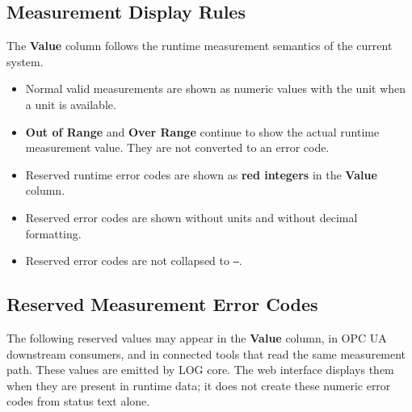 \documentclass[11pt,a4paper]{article}
\begin{document}
\subsection{Measurement Display Rules}
The \textbf{Value} column follows the runtime measurement semantics of the current system.

\begin{itemize}
\item Normal valid measurements are shown as numeric values with the unit when a unit is available.
\item \textbf{Out of Range} and \textbf{Over Range} continue to show the actual runtime measurement value. They are not converted to an error code.
\item Reserved runtime error codes are shown as \textbf{red integers} in the \textbf{Value} column.
\item Reserved error codes are shown without units and without decimal formatting.
\item Reserved error codes are not collapsed to \texttt{---}.
\end{itemize}

\subsection{Reserved Measurement Error Codes}
The following reserved values may appear in the \textbf{Value} column, in OPC UA downstream consumers, and in connected tools that read the same measurement path.
These values are emitted by LOG core. The web interface displays them when they are present in runtime data; it does not create these numeric error codes from status text alone.
\end{document}
